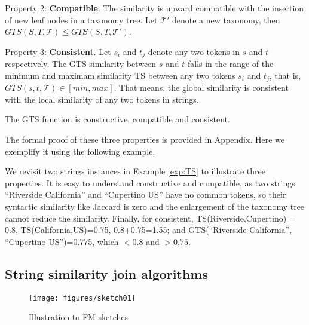 \smallskip

Property 2: \textbf{Compatible}. The similarity is upward compatible with the insertion of new leaf nodes in a taxonomy tree. Let $\mathcal{T}'$ denote a new taxonomy, then $GTS(S,T,\mathcal{T} ) \leq  GTS(S,T, \mathcal{T'}) $.

\smallskip

Property 3: \textbf{Consistent}. Let $s_i$ and $t_j$ denote any two tokens in $s$ and $t$ respectively. The GTS similarity between $s$ and $t$ falls in the range of the minimum and maximam similarity TS between any  two tokens  $s_i$ and $t_j$, that is,  $  GTS(s,t,\mathcal{T} ) \in [min,max] $. That means, the global similarity is consistent with the local similarity of any two tokens in strings.

\smallskip

\begin{lem}  The GTS function is constructive, compatible and consistent. \label{lem:three_properties}
\end{lem}


The formal proof of these three properties is provided in Appendix. Here we exemplify it using the following example.

\begin{example} We revisit two strings instances in Example \ref{exp:TS} to illustrate three properties. It is easy to understand constructive and compatible, as  two strings ``\textsf{Riverside California}'' and ``\textsf{Cupertino US}'' have no common tokens, so their syntactic similarity like Jaccard is zero and the enlargement of the taxonomy tree cannot reduce the similarity. Finally, for consistent,   TS(Riverside,Cupertino) = 0.8, TS(California,US)=0.75,  0.8+0.75=1.55; and GTS(``\textsf{Riverside California}'', ``\textsf{Cupertino US}'')=0.775, which $< 0.8$ and   $> 0.75$.
\end{example}





\subsection{String similarity join algorithms}


\begin{figure}[t]
\centering
\texttt{[image: figures/sketch01]}
 \caption{Illustration to FM sketches }
\label{fig:similaritygeaph}
\end{figure}



